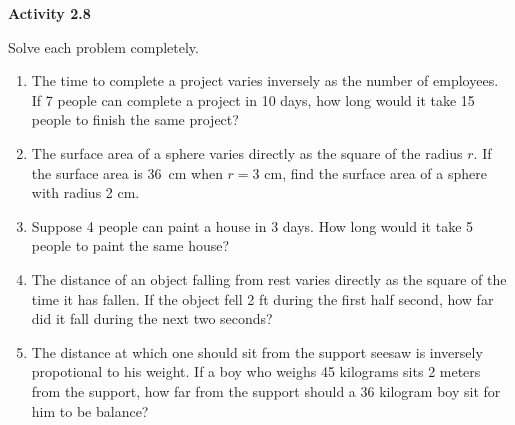 \vspace{0.3ex}
\noindent\textbf{Activity 2.8}

\vspace{0.2ex}

Solve each problem completely.

\begin{enumerate}[noitemsep, label = \color{blue}\arabic*. ]

\item The time to complete a project varies inversely as the number of employees. If 7 people can complete a project in 10 days, how long would it take 15 people to finish the same project?
  
\item The surface area of a sphere varies directly as the square of the radius $r$. If the surface area is 36\pi~cm when $r = 3$ cm, find the surface area of a sphere with radius 2 cm.

\item Suppose 4 people can paint a house in 3 days. How long would it take 5 people to paint the same house?
  
\item The distance of an object falling from rest varies directly as the square of the time it has fallen. If the object fell 2 ft during the first half second, how far did it fall during the next two seconds?
  
\item The distance at which one should sit from the support seesaw is inversely propotional to his weight. If a boy who weighs 45 kilograms sits 2 meters from the support, how far from the support should a 36 kilogram boy sit for him to be balance?

\end{enumerate}
 
